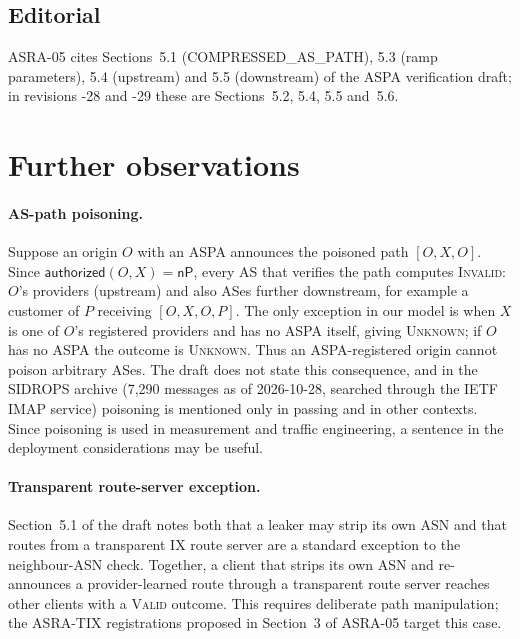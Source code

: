 \documentclass[11pt,a4paper]{article}
\theoremstyle{definition}
\theoremstyle{remark}
\newcommand{\auth}{\mathsf{authorized}}
\newcommand{\nP}{\mathsf{nP}}     %
\newcommand{\Valid}{\textup{\textsc{Valid}}}
\newcommand{\Invalid}{\textup{\textsc{Invalid}}}
\newcommand{\Unknown}{\textup{\textsc{Unknown}}}
\begin{document}
\subsection{Editorial}
ASRA-05 cites Sections~5.1 (COMPRESSED\_AS\_PATH), 5.3 (ramp parameters), 5.4 (upstream) and 5.5
(downstream) of the ASPA verification draft; in revisions -28 and -29 these are Sections~5.2, 5.4, 5.5
and~5.6.

\section{Further observations}
\label{sec:obs}

\paragraph{AS-path poisoning.}
Suppose an origin $O$ with an ASPA announces the poisoned path $[O,X,O]$. Since $\auth(O,X)=\nP$, every AS
that verifies the path computes \Invalid: $O$'s providers (upstream) and also ASes further downstream, for
example a customer of $P$ receiving $[O,X,O,P]$. The only exception in our model is when $X$ is one of
$O$'s registered providers and has no ASPA itself, giving \Unknown; if $O$ has no ASPA the outcome is
\Unknown. Thus an ASPA-registered origin cannot poison arbitrary ASes. The draft does not state this
consequence, and in the SIDROPS archive (7{,}290 messages as of 2026-10-28, searched through the IETF
IMAP service) poisoning is mentioned only in passing and in other contexts. Since poisoning is used in
measurement and traffic engineering, a sentence in the deployment considerations may be useful.

\paragraph{Transparent route-server exception.}
Section~5.1 of the draft notes both that a leaker may strip its own ASN and that routes from a transparent
IX route server are a standard exception to the neighbour-ASN check. Together, a client that strips its
own ASN and re-announces a provider-learned route through a transparent route server reaches other
clients with a \Valid{} outcome. This requires deliberate path manipulation; the ASRA-TIX registrations
proposed in Section~3 of ASRA-05 target this case.
\end{document}
